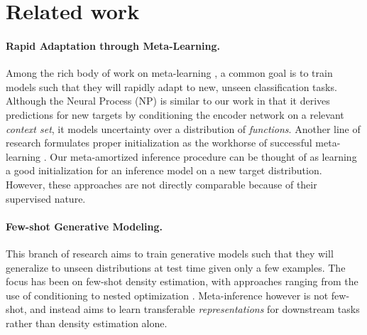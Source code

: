 \section{Related work}
\paragraph{Rapid Adaptation through Meta-Learning.} Among the rich body of work on meta-learning \cite{vinyals2016matching,snell2017prototypical,gordon2018decision}, a common goal is to train models such that they will rapidly adapt to new, unseen classification tasks. Although the Neural Process (NP) \cite{garnelo2018neural,kim2019attentive} is similar to our work in that it derives predictions for new targets by conditioning the encoder network on a relevant \textit{context set}, it models uncertainty over a distribution of \textit{functions}.
Another line of research formulates proper initialization as the workhorse of successful meta-learning \cite{finn2017model,grant2018recasting}. Our meta-amortized inference procedure can be thought of as learning a good initialization for an inference model on a new target distribution. However, these approaches are not directly comparable because of their supervised nature. 

\paragraph{Few-shot Generative Modeling.} This branch of research aims to train generative models such that they will generalize to unseen distributions at test time given only a few examples. The focus has been on few-shot density estimation, with approaches ranging from the use of
conditioning \cite{bartunov2016fast} to nested optimization \cite{reed2017few}. Meta-inference however is not few-shot, and instead aims to learn transferable \textit{representations} for downstream tasks rather than density estimation alone.

